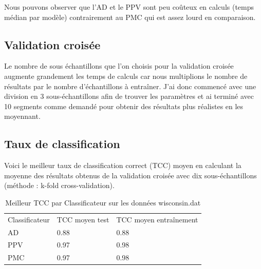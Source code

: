 \documentclass[10pt,letterpaper]{article}
\newlength\savedwidth
\newcommand\thickhline{\noalign{\global\savedwidth\arrayrulewidth\global\arrayrulewidth 2pt}%
\hline
\noalign{\global\arrayrulewidth\savedwidth}}
\begin{document}
Nous pouvons observer que l’AD et le PPV sont peu coûteux en calculs (temps médian par modèle) contrairement au PMC  qui est assez lourd en comparaison.


\subsection*{Validation croisée}
Le nombre de sous échantillons que l’on choisis pour la validation croisée augmente grandement les temps de calculs car nous multiplions le nombre de résultats par le nombre d’échantillons à entraîner. J’ai donc commencé avec une division en 3 sous-échantillons afin de trouver les paramètres et ai terminé avec 10 segments comme demandé pour obtenir des résultats plus réalistes en les moyennant.
\newpage
\subsection*{Taux de classification}
Voici le meilleur taux de classification correct (TCC) moyen en calculant la moyenne des résultats obtenus de la validation croisée avec dix sous-échantillons (méthode : k-fold cross-validation).

\begin{table}[h]
  \centering
  \caption{Meilleur TCC par Classificateur sur les données wisconsin.dat}
\begin{tabular}{lll}
\hline
Classificateur & TCC moyen test 
 & TCC moyen entraînement
\\ \thickhline
AD & \hspace{5mm}0.88 & \hspace{20mm}0.88
 \\ \hline
PPV & \hspace{5mm}0.97 & \hspace{20mm}0.98 \\ \hline
PMC & \hspace{5mm}0.97 & \hspace{20mm}0.98\\ \hline
\end{tabular}
\end{table}
\end{document}
